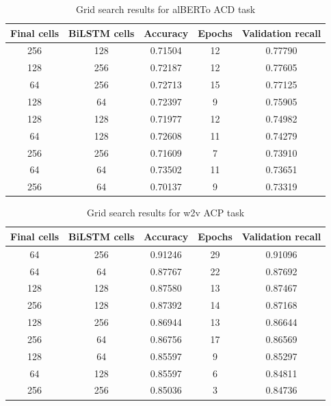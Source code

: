 \documentclass{article}
\begin{document}
            \begin{table}[h!]
                \begin{center}
                \caption{Grid search results for alBERTo ACD task}
                \label{tab:table5}
                \begin{tabular}{c|c|c|c|c}
                    \textbf{Final cells} & \textbf{BiLSTM cells} & \textbf{Accuracy} & \textbf{Epochs} & \textbf{Validation recall}\\
                    \hline
                        256 & 128 & 0.71504 & 12 & 0.77790\\
                        128 & 256 & 0.72187 & 12 & 0.77605\\
                        64  & 256 & 0.72713 & 15 & 0.77125\\
                        128 & 64  & 0.72397 & 9  & 0.75905\\
                        128 & 128 & 0.71977 & 12 & 0.74982\\
                        64  & 128 & 0.72608 & 11 & 0.74279\\
                        256 & 256 & 0.71609 & 7  & 0.73910\\
                        64  & 64  & 0.73502 & 11 & 0.73651\\
                        256 & 64  & 0.70137 & 9  & 0.73319\\
                \end{tabular}
                \end{center}
            \end{table}
            \begin{table}[h!]
                \begin{center}
                \caption{Grid search results for w2v ACP task}
                \label{tab:table7}
                \begin{tabular}{c|c|c|c|c}
                    \textbf{Final cells} & \textbf{BiLSTM cells} & \textbf{Accuracy} & \textbf{Epochs} & \textbf{Validation recall}\\
                    \hline
                        64  & 256 & 0.91246 & 29 & 0.91096\\
                        64  & 64  & 0.87767 & 22 & 0.87692\\
                        128 & 128 & 0.87580 & 13 & 0.87467\\
                        256 & 128 & 0.87392 & 14 & 0.87168\\
                        128 & 256 & 0.86944 & 13 & 0.86644\\
                        256 & 64  & 0.86756 & 17 & 0.86569\\
                        128 & 64  & 0.85597 & 9  & 0.85297\\
                        64  & 128 & 0.85597 & 6  & 0.84811\\
                        256 & 256 & 0.85036 & 3  & 0.84736\\
                \end{tabular}
                \end{center}
            \end{table}
\end{document}

